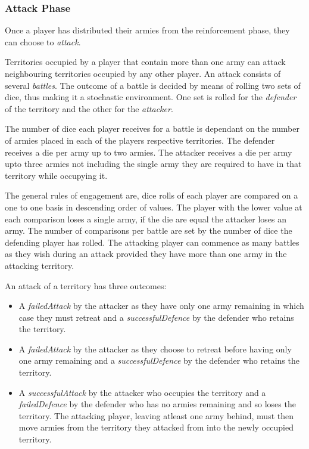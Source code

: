 \documentclass[parskip]{cs4rep}
\begin{document}
\subsubsection{Attack Phase}

Once a player has distributed their armies from the reinforcement phase, they can choose to \textit{attack}. 

Territories occupied by a player that contain more than one army can attack neighbouring territories occupied by any other player. An attack consists of several \textit{battles}. The outcome of a battle is decided by means of rolling two sets of dice, thus making it a stochastic environment. One set is rolled for the \textit{defender} of the territory and the other for the \textit{attacker}. 

The number of dice each player receives for a battle is dependant on the number of armies placed in each of the players respective territories. The defender receives a die per army up to two armies. The attacker receives a die per army upto three armies not including the single army they are required to have in that territory while occupying it. 

The general rules of engagement are, dice rolls of each player are compared on a one to one basis in descending order of values. The player with the lower value at each comparison loses a single army, if the die are equal the attacker loses an army. The number of comparisons per battle are set by the number of dice the defending player has rolled. The attacking player can commence as many battles as they wish during an attack provided they have more than one army in the attacking territory.

An attack of a territory has three outcomes:

\begin{itemize}
\item
A \textit{failedAttack} by the attacker as they have only one army remaining in which case they must retreat and a \textit{successfulDefence} by the defender who retains the territory.
\item
A \textit{failedAttack} by the attacker as they choose to retreat before having only one army remaining and a \textit{successfulDefence} by the defender who retains the territory.
\item
A \textit{successfulAttack} by the attacker who occupies the territory and a \textit{failedDefence} by the defender who has no armies remaining and so loses the territory. The attacking player, leaving atleast one army behind, must then move armies from the territory they attacked from into the newly occupied territory.
\end{itemize}
\end{document}

